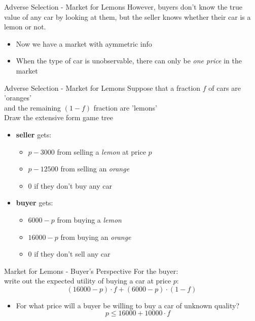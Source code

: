 
\begin{frame}{Adverse Selection - Market for Lemons}
  However, buyers don't know the true value of any car by looking at them,
  but the seller knows whether their car is a lemon or not.
  \begin{itemize}
    \item Now we have a market with \alert{aymmetric info}
    \item When the type of car is unobservable,
    there can only be \textit{one price} in the market
  \end{itemize}
\end{frame}


\begin{frame}{Adverse Selection - Market for Lemons}
   Suppose that a fraction $f$ of cars are 'oranges' \\ 
   and the remaining $(1-f)$ fraction are 'lemons' \\
   Draw the extensive form game tree
   \begin{itemize}
     \item \textbf{seller} gets: 
     \begin{itemize}
       \item $p - 3000$ from selling a \textit{lemon} at price $p$
       \item $p - 12500$ from selling an \textit{orange}
       \item $0$ if they don't buy any car
     \end{itemize}
     \item \textbf{buyer} gets:
     \begin{itemize}
       \item $6000 - p$ from buying a \textit{lemon}
       \item $16000 - p$ from buying an \textit{orange}
       \item $0$ if they don't sell any car
     \end{itemize}
   \end{itemize}
\end{frame}


\begin{frame}{Market for Lemons - Buyer's Perspective}
  For the buyer: \\ 
  write out the expected utility of buying a car at price $p$:
  \pause
  $$(16000 - p) \cdot f + (6000 - p) \cdot (1-f)$$
  \begin{itemize}
    \item For what price will a buyer be willing to buy a car of unknown quality?
    \pause
    $$p \leq 16000 + 10000\cdot f$$
  \end{itemize}
\end{frame}

